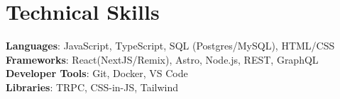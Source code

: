 \documentclass[letterpaper,11pt]{article}
\begin{document}
\section{Technical Skills}
 \begin{itemize}[leftmargin=0.15in, label={}]
    \small{\item{
     \textbf{Languages}{: JavaScript, TypeScript, SQL (Postgres/MySQL), HTML/CSS} \\
     \textbf{Frameworks}{: React(NextJS/Remix), Astro, Node.js, REST, GraphQL} \\
     \textbf{Developer Tools}{: Git, Docker, VS Code} \\
     \textbf{Libraries}{: TRPC, CSS-in-JS, Tailwind}
    }}
 \end{itemize}


\end{document}
